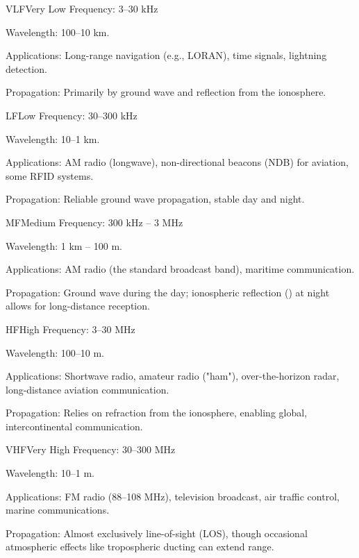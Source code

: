 \begin{spectrumband}{VLF}{Very Low Frequency: 3--30 kHz}
    \item[Wavelength:] 100--10 km.
    \item[Applications:] Long-range navigation (e.g., LORAN), time signals, lightning detection.
    \item[Propagation:] Primarily by ground wave and reflection from the ionosphere.
\end{spectrumband}

\begin{spectrumband}{LF}{Low Frequency: 30--300 kHz}
     \item[Wavelength:] 10--1 km.
    \item[Applications:] AM radio (longwave), non-directional beacons (NDB) for aviation, some RFID systems.
    \item[Propagation:] Reliable ground wave propagation, stable day and night.
\end{spectrumband}

\begin{spectrumband}{MF}{Medium Frequency: 300 kHz -- 3 MHz}
    \item[Wavelength:] 1 km -- 100 m.
    \item[Applications:] AM radio (the standard broadcast band), maritime communication.
    \item[Propagation:] Ground wave during the day; ionospheric reflection () at night allows for long-distance reception.
\end{spectrumband}

\begin{spectrumband}{HF}{High Frequency: 3--30 MHz}
    \item[Wavelength:] 100--10 m.
    \item[Applications:] Shortwave radio, amateur radio ("ham"), over-the-horizon radar, long-distance aviation communication.
    \item[Propagation:] Relies on refraction from the ionosphere, enabling global, intercontinental communication.
\end{spectrumband}

\begin{spectrumband}{VHF}{Very High Frequency: 30--300 MHz}
    \item[Wavelength:] 10--1 m.
    \item[Applications:] FM radio (88--108 MHz), television broadcast, air traffic control, marine communications.
    \item[Propagation:] Almost exclusively line-of-sight (LOS), though occasional atmospheric effects like tropospheric ducting can extend range.
\end{spectrumband}


